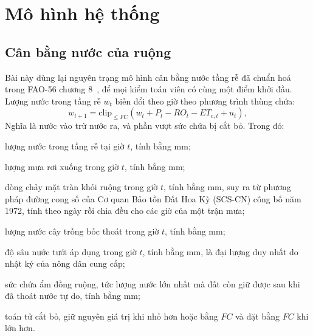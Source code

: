 \section{Mô hình hệ thống}
\label{sec:model}

\subsection{Cân bằng nước của ruộng}

Bài này dùng lại nguyên trạng mô hình cân bằng nước tầng rễ đã chuẩn hoá trong
FAO-56 chương 8~\cite{fao56}, để mọi kiểm toán viên có cùng một điểm khởi đầu.
Lượng nước trong tầng rễ $w_t$ biến đổi theo giờ theo phương trình thùng chứa:
\begin{equation}
w_{t+1}=\mathrm{clip}_{\le FC}\!\left(w_t+P_t-RO_t-ET_{c,t}+u_t\right),
\label{eq:bucket}
\end{equation}
Nghĩa là nước vào trừ nước ra, và phần vượt sức chứa bị cắt bỏ. Trong đó:
\begin{symbolist}
\item[$w_t$] lượng nước trong tầng rễ tại giờ $t$, tính bằng mm;
\item[$P_t$] lượng mưa rơi xuống trong giờ $t$, tính bằng mm;
\item[$RO_t$] dòng chảy mặt tràn khỏi ruộng trong giờ $t$, tính bằng mm, suy ra từ phương pháp đường cong số của Cơ quan Bảo tồn Đất Hoa Kỳ (SCS-CN) công bố năm 1972, tính theo ngày rồi chia đều
  cho các giờ của một trận mưa;
\item[$ET_{c,t}$] lượng nước cây trồng bốc thoát trong giờ $t$, tính bằng mm;
\item[$u_t$] độ sâu nước tưới áp dụng trong giờ $t$, tính bằng mm, là đại lượng
  duy nhất do nhật ký của nông dân cung cấp;
\item[$FC$] sức chứa ẩm đồng ruộng, tức lượng nước lớn nhất mà đất còn giữ được
  sau khi đã thoát nước tự do, tính bằng mm;
\item[$\mathrm{clip}_{\le FC}$] toán tử cắt bỏ, giữ nguyên giá trị khi nhỏ hơn
  hoặc bằng $FC$ và đặt bằng $FC$ khi lớn hơn.
\end{symbolist}

